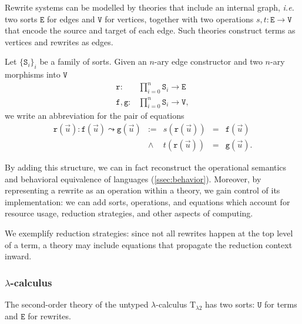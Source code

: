 \documentclass[conference]{IEEEtran}
\theoremstyle{definition}
\newcommand{\mrm}[1]{\mathrm{#1}}
\newcommand{\mtt}[1]{\mathtt{#1}}
\newcommand{\T}{\mrm{T}}
\newcommand{\tts}{\mtt{S}}
\newcommand{\ttu}{\mtt{U}}
\newcommand{\ttf}{\mtt{f}}
\newcommand{\ttg}{\mtt{g}}
\begin{document}
Rewrite systems can be modelled by theories that include an internal graph, {\em i.e.} two sorts $\mtt{E}$ for edges and $\mtt{V}$ for vertices, together with two operations $s,t\colon \mtt{E} \to \mtt{V}$ that encode the source and target of each edge.  Such theories construct terms as vertices and rewrites as edges.

Let $\{\tts_i\}_i$ be a family of sorts.  Given an $n$-ary edge constructor and two $n$-ary morphisms into $\mtt{V}$
\[\begin{array}{rl}
    \mtt{r}: & \prod_{i=0}^n \tts_i \to \mtt{E}\\
    \ttf,\ttg: & \prod_{i=0}^n \tts_i \to \mtt{V},
\end{array}\]
we write an abbreviation for the pair of equations
\[\begin{array}{lcccl}
    \mtt{r}(\vec{u}): \ttf(\vec{u}) \leadsto \ttg(\vec{u}) & := &
     s(\mtt{r}(\vec{u})) & = & \ttf(\vec{u})\\
     & \land & t(\mtt{r}(\vec{u})) & = & \ttg(\vec{u}).
\end{array}\]

By adding this structure, we can in fact reconstruct the operational semantics and behavioral equivalence of languages (\ref{ssec:behavior}). Moreover, by representing a rewrite as an operation within a theory, we gain control of its implementation: we can add sorts, operations, and equations which account for resource usage, reduction strategies, and other aspects of computing.

We exemplify reduction strategies: since not all rewrites happen at the top level of a term, a theory may include equations that propagate the reduction context inward.

\subsubsection{$\lambda$-calculus}
\label{lambdacalc}

The second-order theory of the untyped $\lambda$-calculus $\T_{\lambda 2}$ has two sorts: $\ttu$ for terms and $\mtt{E}$ for rewrites.
\end{document}

